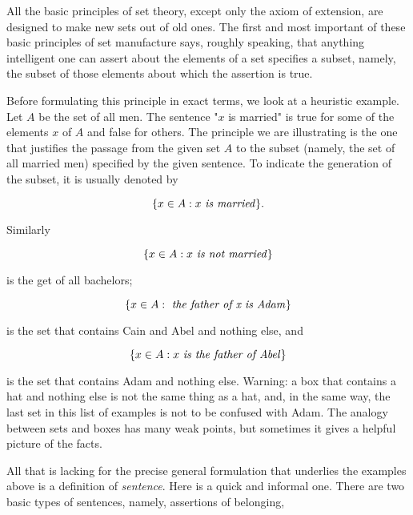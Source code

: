 
All the basic principles of set theory, except only the axiom of extension, are designed to make new sets out of old ones. The first and most important of these basic principles of set manufacture says, roughly speaking, that anything intelligent one can assert about the elements of a set specifies a subset, namely, the subset of those elements about which the assertion is true.

Before formulating this principle in exact terms, we look at a heuristic example. Let $A$ be the set of all men. The sentence "$x$ is married" is true for some of the elements $x$ of $A$ and false for others. The principle we are illustrating is the one that justifies the passage from the given set $A$ to the subset (namely, the set of all married men) specified by the given sentence. To indicate the generation of the subset, it is usually denoted by 

\begin{equation*}
\{ x \in A: x \text{ \textit{is married}} \}.
\end{equation*}

Similarly 

\begin{equation*}
\{ x \in A: x \text{ \textit{is not married}} \}
\end{equation*}

is the get of all bachelors; 

\begin{equation*}
\{ x \in A: \text{ \textit{the father of x is Adam}} \} 
\end{equation*}

is the set that contains Cain and Abel and nothing else, and

\begin{equation*}
\{ x \in A: x \text{ \textit{is the father of Abel}} \}  
\end{equation*}

is the set that contains Adam and nothing else. Warning: a box that contains a hat and nothing else is not the same thing as a hat, and, in the same way, the last set in this list of examples is not to be confused with Adam. The analogy between sets and boxes has many weak points, but sometimes it gives a helpful picture of the facts. 

All that is lacking for the precise general formulation that underlies the examples above is a definition of \textit{sentence}. Here is a quick and informal one. There are two basic types of sentences, namely, assertions of belonging,

